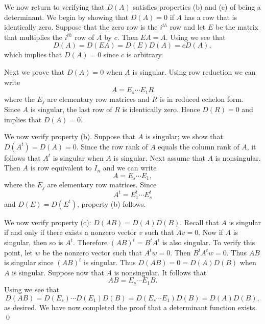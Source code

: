 \documentclass{ximera}
\begin{document}
We now return to verifying that $D(A)$ satisfies properties (b)
and (c) of being a determinant.  We begin by showing that
$D(A)=0$ if $A$ has a row that is identically zero.  Suppose
that the zero row is the $i^{th}$ row and let $E$ be the matrix
that multiplies the $i^{th}$ row of $A$ by $c$.  Then $EA=A$.
Using  we see that
\[
D(A)=D(EA)=D(E)D(A)=cD(A),
\]
which implies that $D(A)=0$ since $c$ is arbitrary.

Next we prove that $D(A)=0$ when $A$ is singular.  Using row 
reduction we can write
\[
A=E_s\cdots E_1R
\]
where the $E_j$ are elementary row matrices and $R$ is in
reduced echelon form.  
Since $A$ is singular, the last row of
$R$ is identically zero.  Hence $D(R)=0$ and 
implies that $D(A)=0$.  

We now verify property (b).  Suppose that $A$ is singular; we
show that $D(A^t)=D(A)=0$.  Since the row rank of $A$ equals the
column rank of $A$, it follows that $A^t$ is singular when $A$
is singular.  Next assume that $A$ is nonsingular.  Then $A$ is
row equivalent to $I_n$ and we can write
\begin{equation}  \label{e:Adecomp}
A=E_s\cdots E_1,
\end{equation}
where the $E_j$ are elementary row matrices.  Since  
\[
A^t = E_1^t\cdots E_s^t
\]
and $D(E)=D(E^t)$, property (b) follows. 

We now verify property (c): $D(AB)=D(A)D(B)$.  Recall that $A$
is singular if and only if there exists a nonzero vector $v$
such that $Av=0$.  Now if $A$ is singular, then so is $A^t$.
Therefore $(AB)^t=B^tA^t$ is also singular.  To verify this
point, let $w$ be the nonzero vector such that $A^tw=0$.  Then
$B^tA^tw=0$.  Thus $AB$ is singular since $(AB)^t$ is singular.
Thus $D(AB)=0=D(A)D(B)$ when $A$ is singular.  Suppose now that
$A$ is nonsingular.  It follows that 
\[
AB = E_s\cdots E_1B.
\]
Using  we see that
\[
D(AB)=D(E_s)\cdots D(E_1)D(B) = D(E_s\cdots E_1)D(B) = D(A)D(B),
\]
as desired. We have now completed the proof that a determinant
function exists. \qed
\end{document}
